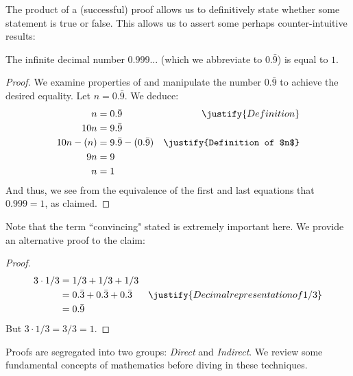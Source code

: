 \documentclass[../proofs.tex]{subfiles}
\begin{document}
The product of a (successful) proof allows us to definitively state whether some
statement is true or false. This allows us to assert some perhaps
counter-intuitive results:
\begin{claim}
  The infinite decimal number $0.999...$ (which we abbreviate to
  $0.\bar{9}$) is equal to $1$.
  \begin{proof}
    We examine properties of and manipulate the number $0.\bar{9}$ to achieve
    the desired equality. Let $n = 0.\bar{9}$. We deduce:
    \begin{align}
       n  &= 0.\bar{9} & \justify{Definition}                             \\
       10n &= 9.\bar{9}   											                          \\
       10n - (n) &= 9.\bar{9} - (0.\bar{9}) & \justify{Definition of $n$} \label{intro: eq: nsubstract} \\
       9n &= 9                                                            \label{intro: eq: 9nwhole}\\
        n &= 1
    \end{align}
    And thus, we see from the equivalence of the first and last equations that
    $0.999 = 1$, as claimed.
  \end{proof}
\end{claim}

Note that the term ``convincing"  stated is extremely important here.
We provide an alternative proof to the claim:
\begin{proof}
  \begin{align}
    3 \cdot 1/3 &= 1/3 + 1/3 + 1/3 \\
                &= 0.\bar{3} + 0.\bar{3} + 0.\bar{3} & \justify{Decimal representation of 1/3} \\
                &= 0.\bar{9}
  \end{align}
  But $3 \cdot 1/3 = 3/3 = 1$.
\end{proof}

Proofs are segregated into two groups: \emph{Direct} and \emph{Indirect}.
We review some fundamental concepts of mathematics before diving in these
techniques.
\end{document}
